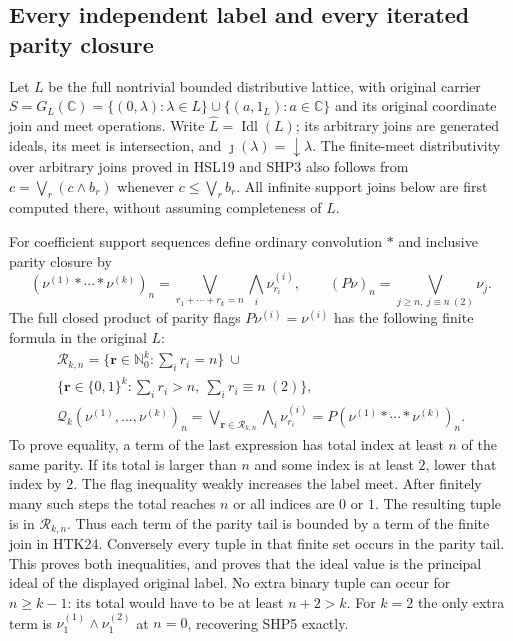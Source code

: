 \subsection{Every independent label and every iterated parity closure}

Let $L$ be the full nontrivial bounded distributive lattice,
with original carrier
$S=G_L(\mathbb C)=\{(0,\lambda):\lambda\in L\}
\cup\{(a,1_L):a\in\mathbb C\}$ and its original coordinate
join and meet operations. Write $\widehat L=\operatorname{Idl}(L)$;
its arbitrary joins are generated ideals, its meet is
intersection, and $\jmath(\lambda)=\downarrow\lambda$.
The finite-meet distributivity over arbitrary joins proved
in HSL19 and SHP3 also follows from
$c=\bigvee_r(c\wedge b_r)$ whenever
$c\le\bigvee_r b_r$. All infinite support joins below are
first computed there, without assuming completeness of $L$.

For coefficient support sequences define ordinary convolution
$*$ and inclusive parity closure by
\begin{equation}\tag{HTK23}
 (\nu^{(1)}*\cdots*\nu^{(k)})_n
       =\bigvee_{r_1+\cdots+r_k=n}\bigwedge_i\nu^{(i)}_{r_i},
 \qquad
 (P\nu)_n=\bigvee_{j\ge n,\ j\equiv n\ (2)}\nu_j.
\end{equation}
The full closed product of parity flags $P\nu^{(i)}=\nu^{(i)}$
has the following finite formula in the original $L$:
\begin{equation}\tag{HTK24}
\begin{gathered}
 \mathscr R_{k,n}=
 \{\mathbf r\in\mathbb N_0^k:\textstyle\sum_i r_i=n\}
 \ \cup\\
 \{\mathbf r\in\{0,1\}^k:\textstyle\sum_i r_i>n,
                                  \ \sum_i r_i\equiv n\ (2)\},\\
 \mathscr Q_k(\nu^{(1)},\ldots,\nu^{(k)})_n
       =\bigvee_{\mathbf r\in\mathscr R_{k,n}}
                                      \bigwedge_i\nu^{(i)}_{r_i}
       =P(\nu^{(1)}*\cdots*\nu^{(k)})_n.
\end{gathered}
\end{equation}
To prove equality, a term of the last expression has total
index at least $n$ of the same parity. If its total is larger
than $n$ and some index is at least $2$, lower that index
by $2$. The flag inequality weakly increases the label meet.
After finitely many such steps the total reaches $n$ or all
indices are $0$ or $1$. The resulting tuple is in
$\mathscr R_{k,n}$. Thus each term of the parity tail is
bounded by a term of the finite join in HTK24. Conversely
every tuple in that finite set occurs in the parity tail.
This proves both inequalities, and proves that the ideal
value is the principal ideal of the displayed original label.
No extra binary tuple can occur for $n\ge k-1$: its total
would have to be at least $n+2>k$. For $k=2$ the only extra
term is $\nu^{(1)}_1\wedge\nu^{(2)}_1$ at $n=0$,
recovering SHP5 exactly.

